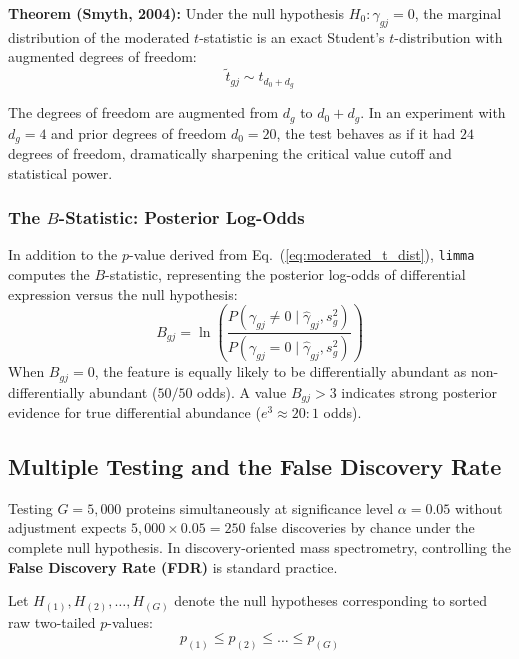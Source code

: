 \documentclass[11pt,twoside,openright]{book}
\begin{document}
\noindent
\textbf{Theorem (Smyth, 2004):} Under the null hypothesis $H_0: \gamma_{gj} = 0$, the marginal distribution of the moderated $t$-statistic is an exact Student's $t$-distribution with augmented degrees of freedom:
\begin{equation}
\tilde{t}_{gj} \sim t_{d_0 + d_g}
\label{eq:moderated_t_dist}
\end{equation}

The degrees of freedom are augmented from $d_g$ to $d_0 + d_g$. In an experiment with $d_g = 4$ and prior degrees of freedom $d_0 = 20$, the test behaves as if it had $24$ degrees of freedom, dramatically sharpening the critical value cutoff and statistical power.

\subsubsection{The \texorpdfstring{$B$}{B}-Statistic: Posterior Log-Odds}
In addition to the $p$-value derived from Eq.~(\ref{eq:moderated_t_dist}), \texttt{limma} computes the $B$-statistic, representing the posterior log-odds of differential expression versus the null hypothesis:
\begin{equation}
B_{gj} = \ln \left( \frac{P(\gamma_{gj} \neq 0 \mid \hat{\gamma}_{gj}, s_g^2)}{P(\gamma_{gj} = 0 \mid \hat{\gamma}_{gj}, s_g^2)} \right)
\label{eq:b_statistic}
\end{equation}
When $B_{gj} = 0$, the feature is equally likely to be differentially abundant as non-differentially abundant ($50/50$ odds). A value $B_{gj} > 3$ indicates strong posterior evidence for true differential abundance ($e^3 \approx 20:1$ odds).

\subsection{Multiple Testing and the False Discovery Rate}

Testing $G = 5,000$ proteins simultaneously at significance level $\alpha = 0.05$ without adjustment expects $5,000 \times 0.05 = 250$ false discoveries by chance under the complete null hypothesis. In discovery-oriented mass spectrometry, controlling the \textbf{False Discovery Rate (FDR)} is standard practice.

Let $H_{(1)}, H_{(2)}, \dots, H_{(G)}$ denote the null hypotheses corresponding to sorted raw two-tailed $p$-values:
\begin{equation}
p_{(1)} \le p_{(2)} \le \dots \le p_{(G)}
\end{equation}
\end{document}
